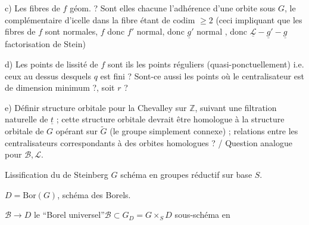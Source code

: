 
c) Les fibres de $f$ géom.  ? Sont elles chacune l'adhérence d'une orbite sous $G$, le complémentaire d'icelle dans la fibre étant de codim $\geq 2$ (ceci impliquant que les fibres de $f$ sont normales,  $f$ donc $f'$ normal, donc $\underline g'$ normal , donc $\underline{\mathscr L}-\underline g'-\underline g$ factorisation de Stein)
\margin{\unsure{*)}}

d) Les points de lissité de $f$ sont ils les points réguliers (quasi-ponctuellement) i.e. ceux au dessus desquels $q$ est  fini ? Sont-ce aussi les points où le centralisateur  est de dimension minimum ?, soit $r$ ?

e)  Définir structure orbitale pour la Chevalley sur $\mathbb Z$, suivant une filtration naturelle de $\underline t$ ; cette structure orbitale devrait être homologue à la structure orbitale de $G$ opérant sur $\tilde G$ (le groupe simplement connexe) ; relations entre les centralisateurs correspondants à des orbites homologues ? / Question analogue pour $\mathscr B,\mathscr L$.


Lissification du  de Steinberg
$G$ schéma en groupes réductif sur base $S$.

$D=\mathrm{Bor}(G)$, schéma des Borels.

$\mathscr B\longrightarrow D$ le ``Borel universel''\quad $\mathscr B\subset G_D=G\times_S D$ sous-schéma en 

